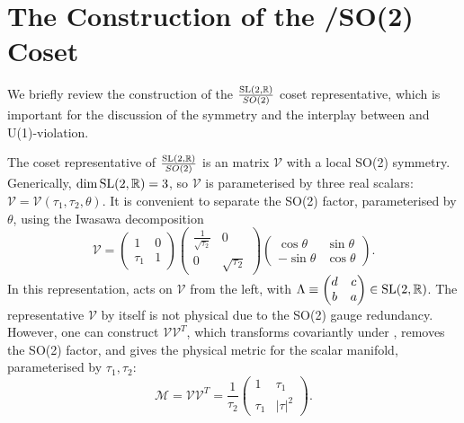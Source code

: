 \section{The Construction of the \texorpdfstring{\SLR{}}{SL(2,R)}/SO(2) Coset}
\label{sec:sl2r-coset}

We briefly review the construction of the $\frac{\mathrm{SL}(2,\mathbb{R}){}}{SO(2)}$ coset representative, which is important for the discussion of the \SLR{} symmetry and the interplay between \SLZ{} and U(1)-violation.

The coset representative of $\frac{\mathrm{SL}(2,\mathbb{R}){}}{SO(2)}$ is an \SLR{} matrix $\mathcal{V}$ with a local SO(2) symmetry.
Generically, $\dim \mathrm{SL}(2,\mathbb{R}){} = 3$, so $\mathcal{V}$ is parameterised by three real scalars: $\mathcal{V} = \mathcal{V}(\tau_1, \tau_2, \theta)$.
It is convenient to separate the SO(2) factor, parameterised by $\theta$, using the Iwasawa decomposition \cite{iwasawa1949}
\begin{equation}
\mathcal{V} =
\begin{pmatrix}
1 & 0 \\
\tau_1 & 1
\end{pmatrix}
\begin{pmatrix}
\frac{1}{\sqrt{\tau_2}} & 0\\
0 & \sqrt{\tau_2}
\end{pmatrix}
\begin{pmatrix}
\cos\theta & \sin\theta\\
-\sin\theta & \cos\theta
\end{pmatrix}.
\label{Iwasawa-decomposition}
\end{equation}
In this representation, \SLR{} acts on $\mathcal{V}$ from the left, with $\Lambda \equiv \begin{pmatrix}
d&c\\b&a\end{pmatrix} \in \mathrm{SL}(2,\mathbb{R}){}$.
The representative $\mathcal{V}$ by itself is not physical due to the SO(2) gauge redundancy.
However, one can construct $\mathcal{V}\mathcal{V}^T$, which transforms covariantly under \SLR{}, removes the SO(2) factor, and gives the physical metric for the scalar manifold, parameterised by $\tau_1, \tau_2$:
\begin{equation}
\mathcal{M} = \mathcal{V}\mathcal{V}^T = \frac{1}{\tau_2}\begin{pmatrix}
1 & \tau_1\\
\tau_1 & |\tau|^2
\end{pmatrix}.
\end{equation}


